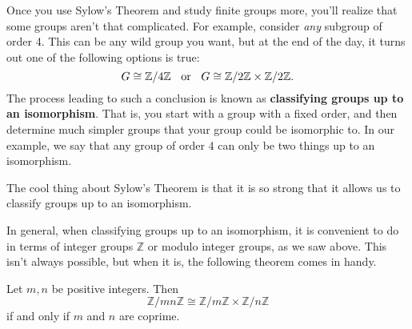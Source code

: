 \documentclass[12pt,letterpaper]{algebra_book}
\theoremstyle{definition}
\begin{document}
    Once you use Sylow's Theorem and study finite groups more, you'll
    realize that some groups aren't that complicated. For example,
    consider \textit{any} subgroup of order 4. This can be any wild
    group you want, but at the end of the day, it turns out one of the
    following options is true:
    \[
        G \cong \mathbb{Z}/4\mathbb{Z} \hspace{0.2cm}\text{ or }\hspace{.2cm} 
        G \cong \mathbb{Z}/2\mathbb{Z} \times \mathbb{Z}/2\mathbb{Z}.
    \]
    The process leading to such a conclusion is known as
    \textbf{classifying groups up to an isomorphism}. That is, you
    start with a group with a fixed order, and then determine much
    simpler groups that your group could be isomorphic to. In our
    example, we say that any group of order 4 can only be two things
    up to an isomorphism.
     
    The cool thing about Sylow's Theorem is that it is so strong that
    it allows us to classify groups up to an isomorphism. 

    In general, when classifying groups up to an isomorphism, it is
    convenient to do in terms of integer groups $\mathbb{Z}$ or
    modulo integer groups, as we saw above. This isn't always
    possible, but when it is, the following theorem comes in handy.

    \begin{thm} \label{zmod_iso_thm}
        Let $m, n$ be positive integers. Then 
        \[
            \mathbb{Z}/mn\mathbb{Z} \cong \mathbb{Z}/m\mathbb{Z} \times \mathbb{Z}/n\mathbb{Z}
        \]
        if and only if $m$ and $n$ are coprime.
    \end{thm}
\end{document}
